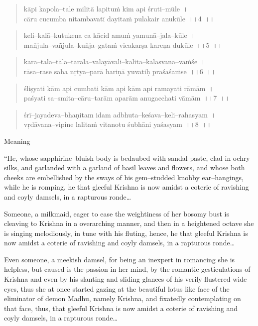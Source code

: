 \begin{verse}
kāpi kapola–tale militā lapituṁ kim api śruti–mūle~।\\ cāru cucumba nitambavatī dayitaṁ pulakair anukūle~।।4~।।
\end{verse}

\begin{verse}
keli–kalā–kutukena ca kācid amuṁ yamunā–jala–kūle~।\\ mañjula–vañjula–kuñja–gataṁ vicakarṣa kareṇa dukūle~।।5~।।
\end{verse}

\begin{verse}
kara–tala–tāla–tarala–valayāvali–kalita–kalasvana–vaṁśe~।\\ rāsa–rase saha nṛtya–parā hariṇā yuvatiḥ praśaśaṁse~।।6~।।
\end{verse}

\begin{verse}
śliṣyati kām api cumbati kām api kām api ramayati rāmām~।\\ paśyati sa–smita–cāru–tarām aparām anugacchati vāmām~।।7~।।
\end{verse}

\begin{verse}
śrī–jayadeva–bhaṇitam idam adbhuta–keśava–keli–rahasyam~।\\ vṛdāvana–vipine lalitaṁ vitanotu śubhāni yaśasyam~।।8~।।
\end{verse}

Meaning

\begin{myquote}
“He, whose sapphirine–bluish body is bedaubed with sandal paste, clad in ochry silks, and garlanded with a garland of basil leaves and flowers, and whose both cheeks are embellished by the sways of his gem–studded knobby ear–hangings, while he is romping, he that gleeful Krishna is now amidst a coterie of ravishing and coyly damsels, in a rapturous ronde…
\end{myquote}

\begin{myquote}
Someone, a milkmaid, eager to ease the weightiness of her bosomy bust is cleaving to Krishna in a overarching manner, and then in a heightened octave she is singing melodiously, in tune with his fluting, hence, he that gleeful Krishna is now amidst a coterie of ravishing and coyly damsels, in a rapturous ronde…
\end{myquote}

\begin{myquote}
Even someone, a meekish damsel, for being an inexpert in romancing she is helpless, but caused is the passion in her mind, by the romantic gesticulations of Krishna and even by his slanting and sliding glances of his verily flustered wide eyes, thus she at once started gazing at the beautiful lotus like face of the eliminator of demon Madhu, namely Krishna, and fixatedly contemplating on that face, thus, that gleeful Krishna is now amidst a coterie of ravishing and coyly damsels, in a rapturous ronde…
\end{myquote}

